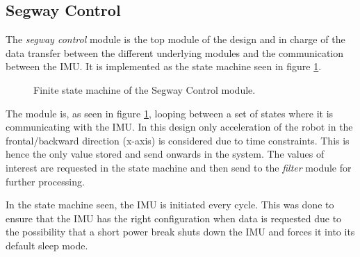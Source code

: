 \subsection{Segway Control}
The \textit{segway control} module is the top module of the design and in charge of the data transfer between the different underlying modules and the communication between the IMU.
It is implemented as the state machine seen in figure \ref{fig:segwaycontrol_fsm}.


\begin{figure}[H]
\centering


\caption{Finite state machine of the Segway Control module.}
\label{fig:segwaycontrol_fsm}
\end{figure}

The module is, as seen in figure \ref{fig:segwaycontrol_fsm}, looping between a set of states where it is communicating with the IMU.
In this design only acceleration of the robot in the frontal/backward direction (x-axis) is considered due to time constraints.
This is hence the only value stored and send onwards in the system.
The values of interest are requested in the state machine and then send to the \textit{filter} module for further processing.

In the state machine seen, the IMU is initiated every cycle.
This was done to ensure that the IMU has the right configuration when data is requested due to the possibility that a short power break shuts down the IMU and forces it into its default sleep mode.

